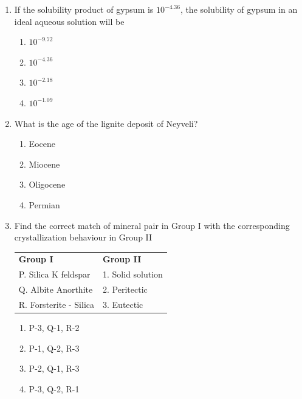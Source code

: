 \documentclass[journal,12pt,onecolumn]{IEEEtran}
\theoremstyle{remark}
\begin{document}
\begin{enumerate}
    \item If the solubility product of gypsum is $10^{-4.36}$, the solubility  of gypsum in an ideal aqueous solution will be

    \hfill{}
    
    \begin{multicols}{2}
        \begin{enumerate}
            \item $10^{-9.72}$
            \item $10^{-4.36}$
            \item $10^{-2.18}$
            \item $10^{-1.09}$
        \end{enumerate}
    \end{multicols}

    \item What is the age of the lignite deposit of Neyveli?

    \hfill{}
    
    \begin{multicols}{4}
        \begin{enumerate}
            \item Eocene
            \item Miocene
            \item Oligocene
            \item Permian
        \end{enumerate}
    \end{multicols}

\newpage

    \item Find the correct match of mineral pair in Group I with the corresponding crystallization behaviour in Group II

    \hfill{}
    
    \begin{tabular}{ll}
        \textbf{Group I} & \textbf{Group II} \\
        P. Silica K feldspar & 1. Solid solution \\
        Q. Albite Anorthite & 2. Peritectic \\
        R. Forsterite - Silica & 3. Eutectic \\
    \end{tabular}
    
    \begin{multicols}{2}
        \begin{enumerate}
            \item P-3, Q-1, R-2
            \item P-1, Q-2, R-3
            \item P-2, Q-1, R-3
            \item P-3, Q-2, R-1
        \end{enumerate}
    \end{multicols}


\end{enumerate}
\end{document}
